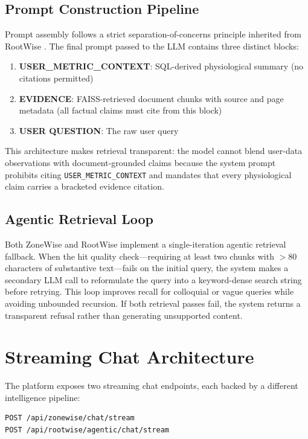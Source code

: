 \documentclass[11pt,twocolumn]{article}
\begin{document}
\subsection{Prompt Construction Pipeline}

Prompt assembly follows a strict separation-of-concerns principle inherited from RootWise \cite{faris2025rootwise}. The final prompt passed to the LLM contains three distinct blocks:

\begin{enumerate}
    \item \textbf{USER\_METRIC\_CONTEXT}: SQL-derived physiological summary (no citations permitted)
    \item \textbf{EVIDENCE}: FAISS-retrieved document chunks with source and page metadata (all factual claims must cite from this block)
    \item \textbf{USER QUESTION}: The raw user query
\end{enumerate}

This architecture makes retrieval transparent: the model cannot blend user-data observations with document-grounded claims because the system prompt prohibits citing \texttt{USER\_METRIC\_CONTEXT} and mandates that every physiological claim carries a bracketed evidence citation.

\subsection{Agentic Retrieval Loop}

Both ZoneWise and RootWise implement a single-iteration agentic retrieval fallback. When the hit quality check—requiring at least two chunks with $>$80 characters of substantive text—fails on the initial query, the system makes a secondary LLM call to reformulate the query into a keyword-dense search string before retrying. This loop improves recall for colloquial or vague queries while avoiding unbounded recursion. If both retrieval passes fail, the system returns a transparent refusal rather than generating unsupported content.

\section{Streaming Chat Architecture}

The platform exposes two streaming chat endpoints, each backed by a different intelligence pipeline:

\begin{verbatim}
POST /api/zonewise/chat/stream
POST /api/rootwise/agentic/chat/stream
\end{verbatim}
\end{document}
